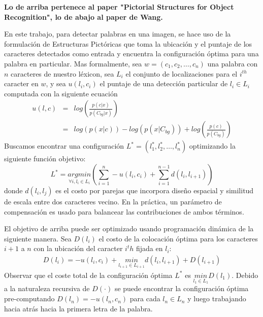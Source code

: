 	\textbf{Lo de arriba pertenece al paper "Pictorial Structures for Object Recognition", lo de abajo al paper de Wang.}
	
	En este trabajo, para detectar palabras en una imagen, se hace uso de la formulación de Estructuras Pictóricas que toma la ubicación y el puntaje de los caracteres detectados como entrada y encuentra la configuración óptima para una palabra en particular. Mas formalmente, sea $w=(c_1,c_2,\dots,c_n)$ una palabra con $n$ caracteres de nuestro léxicon, sea $L_i$ el conjunto de localizaciones para el $i^{th}$ caracter en $w$, y sea $u(l_i,c_i)$ el puntaje de una detección particular de $l_i \in L_i$ computada con la siguiente ecuación
		\begin{eqnarray}
			u(l,c) &=& log\left( \frac{p(c \vert x)}{p(C_{bg} \vert x)} \right) \\
			&=& log(p(x\vert c)) - log(p(x\vert C_{bg})) + log\left( \frac{p(c)}{p(C_{bg})} \right)
		\end{eqnarray}
		Buscamos encontrar una configuración $L^{*} = (l_1^*, l_2^*, \dots, l_n^*)$ optimizando la siguiente función objetivo:		
		$$L^* = \underset{\forall i, l_i \in L_i}{argmin}\left( \sum_{i=1}^n-u(l_i,c_i) + \sum_{i=1}^{n-1}d(l_i,l_{i+1}) \right)$$
		donde $d(l_i,l_j)$ es el costo por parejas que incorpora diseño espacial y similitud de escala entre dos caracteres vecino. En la práctica, un parámetro de compensación es usado para balancear las contribuciones de ambos términos.
		
		El objetivo de arriba puede ser optimizado usando programación dinámica de la siguiente manera. Sea $D(l_i)$ el costo de la colocación óptima para los caracteres $i+1$ a $n$ con la ubicación del caracter $i^th$ fijada en $l_i$:
		\begin{eqnarray}
			D(l_i) = -u(l_i,c_i) + \underset{l_{i+1} \in L_{i+1}}{min} d(l_i, l_{i+1}) + D(l_{i+1})
		\end{eqnarray}
		Observar que el coste total de la configuración óptima $L^*$ es $\underset{l_1 \in L_1}{min}D(l_1)$. Debido a la naturaleza recursiva de $D(\cdot)$ se puede encontrar la configuración óptima pre-computando $D(l_n) = -u(l_n,c_n)$ para cada $l_n \in L_n$ y luego trabajando hacia atrás hacia la primera letra de la palabra.